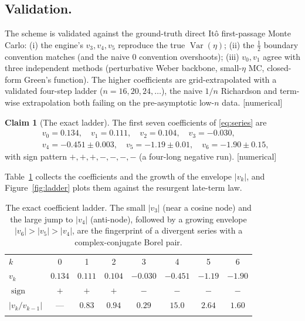 \documentclass[11pt,reqno]{amsart}
\theoremstyle{plain}
\theoremstyle{definition}
\newtheorem{claim}[theorem]{Claim}
\theoremstyle{remark}
\DeclareMathOperator{\Var}{Var}
\newcommand{\tagN}{{\footnotesize\textsf{[numerical]}}}
\begin{document}
\subsection{Validation.}
The scheme is validated against the ground-truth direct It\^o first-passage Monte Carlo: (i) the
engine's $v_3,v_4,v_5$ reproduce the true $\Var(\eta)$; (ii) the $\tfrac12$ boundary convention
matches (and the naive $0$ convention overshoots); (iii) $v_0,v_1$ agree with three independent
methods (perturbative Weber backbone, small-$\eta$ MC, closed-form Green's function). The
higher coefficients are grid-extrapolated with a validated four-step ladder ($n=16,20,24,\dots$),
the naive $1/n$ Richardson and term-wise extrapolation both failing on the pre-asymptotic
low-$n$ data. \tagN

\begin{claim}[The exact ladder]\label{claim:ladder}
The first seven coefficients of \eqref{eq:series} are
\begin{equation}\label{eq:coeffs}
\begin{aligned}
&v_0=0.134,\quad v_1=0.111,\quad v_2=0.104,\quad v_3=-0.030,\\
&v_4=-0.451\pm0.003,\quad v_5=-1.19\pm0.01,\quad v_6=-1.90\pm0.15,
\end{aligned}
\end{equation}
with sign pattern $+,+,+,-,-,-,-$ (a four-long negative run). \tagN
\end{claim}

Table~\ref{tab:ladder} collects the coefficients and the growth of the envelope $|v_k|$, and
Figure~\ref{fig:ladder} plots them against the resurgent late-term law.

\begin{table}[h]
\centering
\begin{tabular}{lccccccc}
\hline\noalign{\smallskip}
$k$ & 0 & 1 & 2 & 3 & 4 & 5 & 6\\
\noalign{\smallskip}\hline\noalign{\smallskip}
$v_k$      & $0.134$ & $0.111$ & $0.104$ & $-0.030$ & $-0.451$ & $-1.19$ & $-1.90$\\
$\operatorname{sign}$ & $+$ & $+$ & $+$ & $-$ & $-$ & $-$ & $-$\\
$|v_k/v_{k-1}|$ & --- & $0.83$ & $0.94$ & $0.29$ & $15.0$ & $2.64$ & $1.60$\\
\noalign{\smallskip}\hline
\end{tabular}
\medskip
\caption{The exact coefficient ladder. The small $|v_3|$ (near a cosine node) and the large jump
to $|v_4|$ (anti-node), followed by a growing envelope $|v_6|>|v_5|>|v_4|$, are the fingerprint
of a divergent series with a complex-conjugate Borel pair.}
\label{tab:ladder}
\end{table}
\end{document}
